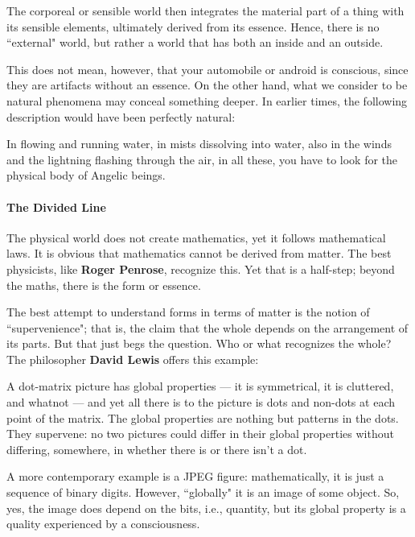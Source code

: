 The corporeal or sensible world then integrates the material part of a thing with its sensible elements, ultimately derived from its essence. Hence, there is no ``external" world, but rather a world that has both an inside and an outside.

This does not mean, however, that your automobile or android is conscious, since they are artifacts without an essence. On the other hand, what we consider to be natural phenomena may conceal something deeper. In earlier times, the following description would have been perfectly natural:

\begin{quotex}
In flowing and running water, in mists dissolving into water, also in the winds and the lightning flashing through the air, in all these, you have to look for the physical body of Angelic beings. 

\end{quotex}
\paragraph{The Divided Line}
The physical world does not create mathematics, yet it follows mathematical laws. It is obvious that mathematics cannot be derived from matter. The best physicists, like \textbf{Roger Penrose}, recognize this. Yet that is a half-step; beyond the maths, there is the form or essence.

The best attempt to understand forms in terms of matter is the notion of ``supervenience"; that is, the claim that the whole depends on the arrangement of its parts. But that just begs the question. Who or what recognizes the whole? The philosopher \textbf{David Lewis} offers this example:

\begin{quotex}
A dot-matrix picture has global properties — it is symmetrical, it is cluttered, and whatnot — and yet all there is to the picture is dots and non-dots at each point of the matrix. The global properties are nothing but patterns in the dots. They supervene: no two pictures could differ in their global properties without differing, somewhere, in whether there is or there isn't a dot.

\end{quotex}
A more contemporary example is a JPEG figure: mathematically, it is just a sequence of binary digits. However, ``globally" it is an image of some object. So, yes, the image does depend on the bits, i.e., quantity, but its global property is a quality experienced by a consciousness.


